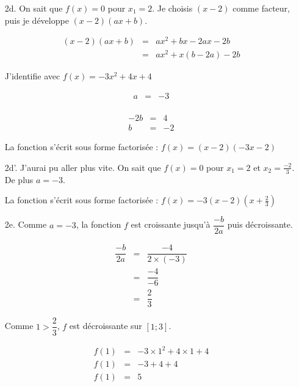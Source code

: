 \documentclass[11pt]{article}
\begin{document}
\begin{enumerate}
\item[2d.] On sait que $f(x) = 0$ pour $x_1 = 2$. Je choisis $(x-2)$ comme facteur, puis je développe $(x-2)(ax + b)$.

  \begin{eqnarray*}  
    (x-2)(ax + b) &=& ax^2 + bx -2ax -2b \\
    &=& ax^2 + x(b-2a) -2b
  \end{eqnarray*}

  J'identifie avec $f(x) = -3x^2 + 4x + 4$ \\

  \begin{multicols}{2}
    \begin{eqnarray*}  
      a &=& -3 \\
    \end{eqnarray*} 

    \begin{eqnarray*}  
      -2b &=& 4 \\
      b &=& -2
    \end{eqnarray*} 
  \end{multicols}

  La fonction s'écrit sous forme factorisée : $f(x) = (x-2)(-3x - 2)$

\item[2d'.] J'aurai pu aller plus vite.
  On sait que $f(x) = 0$ pour $x_1 = 2$ et $x_2 = \frac{-2}{3}$. De plus $a = -3$.
  
  La fonction s'écrit sous forme factorisée : $f(x) = -3(x-2)(x + \frac{2}{3})$

  \newpage
\item[2e.] Comme $a=-3$, la fonction $f$ est croissante jusqu'à $\dfrac{-b}{2a}$ puis décroissante.\\

  \begin{multicols}{2}
    \begin{eqnarray*}
      \dfrac{-b}{2a} &=& \dfrac{-4}{2 \times (-3)} \\
      &=& \dfrac{-4}{-6} \\
      &=& \dfrac{2}{3}
    \end{eqnarray*}

    Comme $1 > \dfrac{2}{3}$, $f$ est décroissante sur $[1 ; 3]$.

    \begin{eqnarray*}
      f(1) &=& -3 \times 1^2 + 4 \times 1 + 4 \\
      f(1) &=& -3 + 4 + 4 \\
      f(1) &=& 5
    \end{eqnarray*}


\end{multicols}
\end{enumerate}
\end{document}
